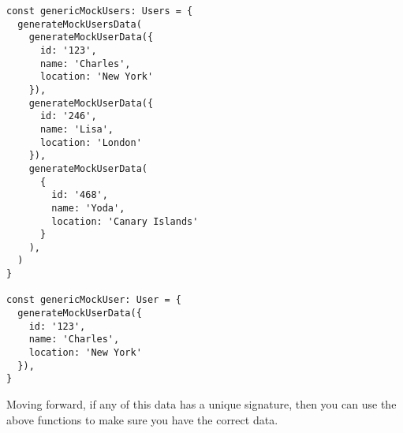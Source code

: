 \begin{lstlisting}
const genericMockUsers: Users = {
  generateMockUsersData(
    generateMockUserData({
      id: '123',
      name: 'Charles',
      location: 'New York'
    }),
    generateMockUserData({
      id: '246',
      name: 'Lisa',
      location: 'London'
    }),
    generateMockUserData(
      {
        id: '468',
        name: 'Yoda',
        location: 'Canary Islands'
      }
    ),
  )
}

const genericMockUser: User = {
  generateMockUserData({
    id: '123',
    name: 'Charles',
    location: 'New York'
  }),
}
\end{lstlisting}

Moving forward, if any of this data has a unique signature, then you can use
the above functions to make sure you have the correct data.
